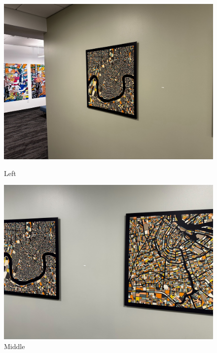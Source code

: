 \begin{figure}[H]
  \centering
  \begin{minipage}{0.29\textwidth}
    \includegraphics[width=\textwidth]{images/left.jpg}
    \caption{Left}
    \label{fig:cv-cover}
  \end{minipage}
  \hfill
  \begin{minipage}{0.29\textwidth}
    \includegraphics[width=\textwidth]{images/middle.jpg}
    \caption{Middle}
    \label{fig:hp-cover}
  \end{minipage}
  \hfill
  \begin{minipage}{0.29\textwidth}

\end{minipage}
\end{figure}
